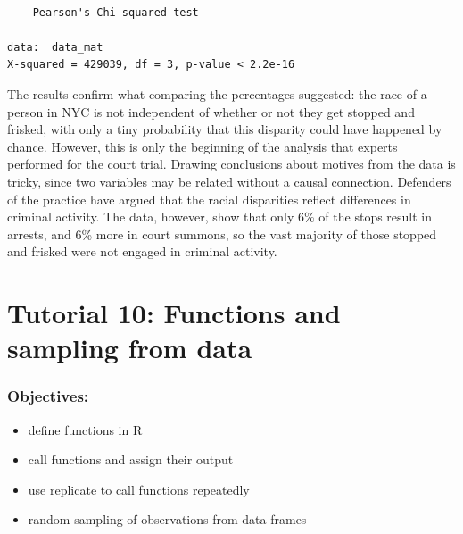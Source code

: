 \documentclass[
  letterpaper,
  DIV=11,
  numbers=noendperiod]{scrreprt}
\providecommand{\tightlist}{%
  \setlength{\itemsep}{0pt}\setlength{\parskip}{0pt}}\usepackage{longtable,booktabs,array}
\begin{document}
\begin{verbatim}

    Pearson's Chi-squared test

data:  data_mat
X-squared = 429039, df = 3, p-value < 2.2e-16
\end{verbatim}

The results confirm what comparing the percentages suggested: the race
of a person in NYC is not independent of whether or not they get stopped
and frisked, with only a tiny probability that this disparity could have
happened by chance. However, this is only the beginning of the analysis
that experts performed for the court trial. Drawing conclusions about
motives from the data is tricky, since two variables may be related
without a causal connection. Defenders of the practice have argued that
the racial disparities reflect differences in criminal activity. The
data, however, show that only 6\% of the stops result in arrests, and
6\% more in court summons, so the vast majority of those stopped and
frisked were not engaged in criminal activity.


\hypertarget{tutorial-10-functions-and-sampling-from-data}{%
\chapter*{Tutorial 10: Functions and sampling from
data}\label{tutorial-10-functions-and-sampling-from-data}}


\hypertarget{objectives-4}{%
\subsection*{Objectives:}\label{objectives-4}}

\begin{itemize}
\tightlist
\item
  define functions in R
\item
  call functions and assign their output
\item
  use replicate to call functions repeatedly
\item
  random sampling of observations from data frames
\end{itemize}
\end{document}
